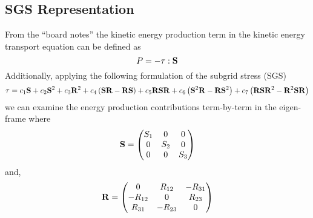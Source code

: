 \subsection{SGS Representation}
From the ``board notes'' the kinetic energy production term in the kinetic
energy transport equation can be defined as
\begin{equation}
    P =  - \mathbf{\tau}:\mathbf{S}
\end{equation}
Additionally, applying the following  formulation of the subgrid stress
(SGS) 
\begin{equation}
    \mathbf{\tau} = c_{1} \mathbf{S} + c_{2} \mathbf{S}^2 + c_{3} \mathbf{R}^2
                + c_{4} \left(\mathbf{S} \mathbf{R} - \mathbf{R} \mathbf{S} \right)
                + c_{5} \mathbf{R} \mathbf{S} \mathbf{R} 
                + c_{6} \left(\mathbf{S}^2 \mathbf{R} - \mathbf{R} \mathbf{S}^2 \right)
                + c_{7} \left( \mathbf{R} \mathbf{S} \mathbf{R}^2 - \mathbf{R}^2 \mathbf{S} \mathbf{R} \right) 
                \label{eq:SGS-tf-8}
\end{equation}
we can examine the energy production contributions term-by-term in the 
eigen-frame where
\begin{equation}
    \mathbf{S} =
    \begin{pmatrix}
        S_{1}      & 0         & 0         \\
        0           & S_{2}    & 0         \\
        0           & 0         & S_{3}    \\
    \end{pmatrix}
    \label{eq:Sij}
\end{equation}
and,
\begin{equation}
    \mathbf{R} =
    \begin{pmatrix}
        0           & R_{12}    & -R_{31}   \\
        -R_{12}     & 0         & R_{23}    \\
        R_{31}      & -R_{23}   & 0         \\
    \end{pmatrix}
\end{equation}








